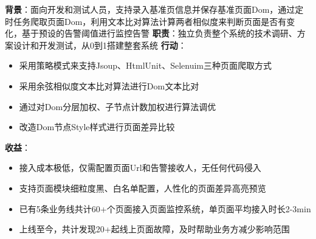 \documentclass{resume}
\begin{document}
    \begin{onehalfspacing}
        \textbf{背景}：面向开发和测试人员，支持录入基准页信息并保存基准页面Dom，通过定时任务爬取页面Dom，利用文本比对算法计算两者相似度来判断页面是否有变化，基于预设的告警阈值进行监控告警\newline
        \textbf{职责}：独立负责整个系统的技术调研、方案设计和开发测试，从0到1搭建整套系统\newline
        \textbf{行动}：
        \begin{itemize}
            \item 采用策略模式来支持Jsoup、HtmlUnit、Selenuim三种页面爬取方式
            \item 采用余弦相似度文本比对算法进行Dom文本比对
            \item 通过对Dom分层加权、子节点计数加权进行算法调优
            \item 改造Dom节点Style样式进行页面差异比较
        \end{itemize}
        \textbf{收益}：
        \begin{itemize}
            \item 接入成本极低，仅需配置页面Url和告警接收人，无任何代码侵入
            \item 支持页面模块细粒度黑、白名单配置，人性化的页面差异高亮预览
            \item 已有5条业务线共计60+个页面接入页面监控系统，单页面平均接入时长2-3min
            \item 上线至今，共计发现20+起线上页面故障，及时帮助业务方减少影响范围
        \end{itemize}
    \end{onehalfspacing}
    \blankline{ }
\end{document}
